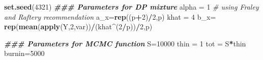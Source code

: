 \documentclass[
]{article}
\newenvironment{Shaded}{\begin{snugshade}}{\end{snugshade}}
\newcommand{\CommentTok}[1]{\textcolor[rgb]{0.56,0.35,0.01}{\textit{#1}}}
\newcommand{\DecValTok}[1]{\textcolor[rgb]{0.00,0.00,0.81}{#1}}
\newcommand{\DocumentationTok}[1]{\textcolor[rgb]{0.56,0.35,0.01}{\textbf{\textit{#1}}}}
\newcommand{\FunctionTok}[1]{\textcolor[rgb]{0.13,0.29,0.53}{\textbf{#1}}}
\newcommand{\NormalTok}[1]{#1}
\newcommand{\OtherTok}[1]{\textcolor[rgb]{0.56,0.35,0.01}{#1}}
\newcommand{\SpecialCharTok}[1]{\textcolor[rgb]{0.81,0.36,0.00}{\textbf{#1}}}
\begin{document}
\begin{Shaded}
\begin{Highlighting}[]
\FunctionTok{set.seed}\NormalTok{(}\DecValTok{4321}\NormalTok{)}
\DocumentationTok{\#\#\# Parameters for DP mixture}
\NormalTok{alpha }\OtherTok{=} \DecValTok{1}
\CommentTok{\# using Fraley and Raftery recommendation}
\NormalTok{a\_x}\OtherTok{=}\FunctionTok{rep}\NormalTok{((p}\SpecialCharTok{+}\DecValTok{2}\NormalTok{)}\SpecialCharTok{/}\DecValTok{2}\NormalTok{,p)}
\NormalTok{khat }\OtherTok{=} \DecValTok{4}
\NormalTok{b\_x}\OtherTok{=} \FunctionTok{rep}\NormalTok{(}\FunctionTok{mean}\NormalTok{(}\FunctionTok{apply}\NormalTok{(Y,}\DecValTok{2}\NormalTok{,var))}\SpecialCharTok{/}\NormalTok{(khat}\SpecialCharTok{\^{}}\NormalTok{(}\DecValTok{2}\SpecialCharTok{/}\NormalTok{p))}\SpecialCharTok{/}\DecValTok{2}\NormalTok{,p)}

\DocumentationTok{\#\#\# Parameters for MCMC function}
\NormalTok{S}\OtherTok{=}\DecValTok{10000}
\NormalTok{thin }\OtherTok{=} \DecValTok{1}
\NormalTok{tot }\OtherTok{=}\NormalTok{ S}\SpecialCharTok{*}\NormalTok{thin}
\NormalTok{burnin}\OtherTok{=}\DecValTok{5000}


\end{Highlighting}
\end{Shaded}
\end{document}
